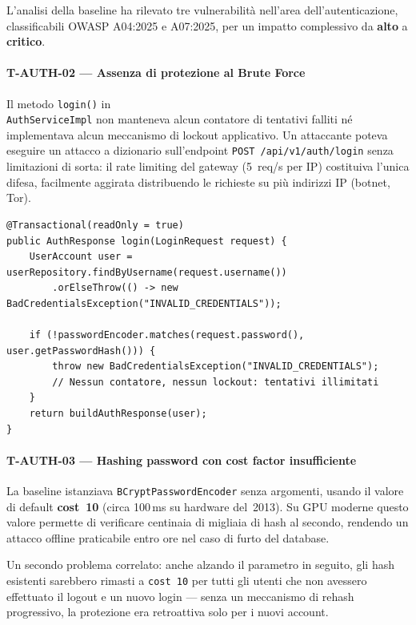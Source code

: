 ﻿\documentclass[a4paper,12pt]{report}
\begin{document}
L'analisi della baseline ha rilevato tre vulnerabilità nell'area dell'autenticazione,
classificabili OWASP A04:2025 e A07:2025, per un impatto complessivo da \textbf{alto} a
\textbf{critico}.

\paragraph{T-AUTH-02 — Assenza di protezione al Brute Force}
Il metodo \texttt{login()} in \\ \texttt{AuthServiceImpl} non manteneva alcun contatore
di tentativi falliti né implementava alcun meccanismo di lockout applicativo.
Un attaccante poteva eseguire un attacco a dizionario sull'endpoint \texttt{POST /api/v1/auth/login}
senza limitazioni di sorta: il rate limiting del gateway (5~req/s per IP) costituiva l'unica
difesa, facilmente aggirata distribuendo le richieste su più indirizzi IP (botnet, Tor).

\begin{insecurebox}[title={AuthServiceImpl.java --- assenza di account lockout (baseline)}]
\begin{lstlisting}[style=java]
@Transactional(readOnly = true)
public AuthResponse login(LoginRequest request) {
    UserAccount user = userRepository.findByUsername(request.username())
        .orElseThrow(() -> new BadCredentialsException("INVALID_CREDENTIALS"));

    if (!passwordEncoder.matches(request.password(), user.getPasswordHash())) {
        throw new BadCredentialsException("INVALID_CREDENTIALS");
        // Nessun contatore, nessun lockout: tentativi illimitati
    }
    return buildAuthResponse(user);
}
\end{lstlisting}
\end{insecurebox}

\paragraph{T-AUTH-03 — Hashing password con cost factor insufficiente}
La baseline istanziava \texttt{BCryptPasswordEncoder} senza argomenti, usando il valore
di default \textbf{cost~10} (circa 100\,ms su hardware del~2013). Su GPU moderne questo
valore permette di verificare centinaia di migliaia di hash al secondo, rendendo un attacco
offline praticabile entro ore nel caso di furto del database.

Un secondo problema correlato: anche alzando il parametro in seguito, gli hash esistenti
sarebbero rimasti a \texttt{cost~10} per tutti gli utenti che non avessero effettuato il
logout e un nuovo login --- senza un meccanismo di rehash progressivo, la protezione era
retroattiva solo per i nuovi account.
\end{document}
